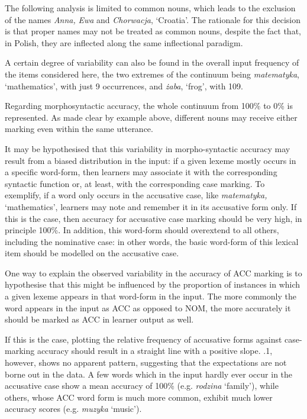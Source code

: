 The following analysis is limited to common nouns, which leads to the exclusion of the names \textit{Anna,} \textit{Ewa} and \textit{Chorwacja}, ‘Croatia’. The rationale for this decision is that proper names may not be treated as common nouns, despite the fact that, in Polish, they are inflected  along the same inflectional paradigm. 

A certain degree of variability can also be found in the overall input frequency of the items considered here, the two extremes of the continuum being \textit{matematyka}, ‘mathematics’, with just 9 occurrences, and \textit{żaba}, ‘frog’, with 109. 

Regarding morphosyntactic accuracy, the whole continuum from 100\% to 0\% is represented. As made clear by example  above, different nouns may receive either marking even within the same utterance. 

It may be hypothesised that this variability in morpho-syntactic accuracy may result from a biased distribution in the input: if a given lexeme mostly occurs in a specific word-form, then learners may associate it with the corresponding syntactic function or, at least, with the corresponding case marking. To exemplify, if a word only occurs in the accusative case, like \textit{matematyka,} ‘mathematics’, learners may note and remember it in its accusative form only. If this is the case, then accuracy for accusative case marking should be very high, in principle 100\%. In addition, this word-form should overextend to all others, including the nominative case: in other words, the basic word-form of this lexical item should be modelled on the accusative case.

One way to explain the observed variability in the accuracy of ACC marking is to hypothesise that this might be influenced by the proportion of instances in which a given lexeme appears in that word-form in the input. The more commonly the word appears in the input as ACC as opposed to NOM, the more accurately it should be marked as ACC in learner output as well.

If this is the case, plotting the relative frequency of accusative forms against case-marking accuracy should result in a straight line with a positive slope. .1, however, shows no apparent pattern, suggesting that the expectations are not borne out in the data. A few words which in the input hardly ever occur in the accusative case show a mean accuracy of 100\% (e.g. \textit{rodzina} ‘family’), while others, whose ACC word form is much more common, exhibit much lower accuracy scores (e.g. \textit{muzyka} ‘music’).

